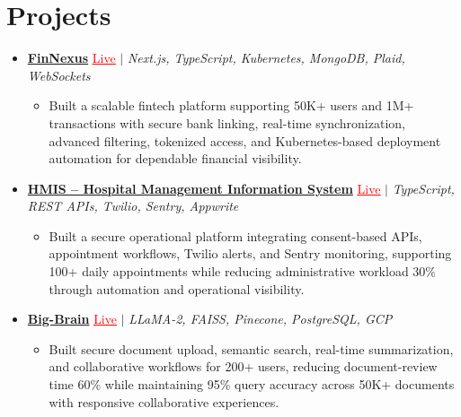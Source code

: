 \documentclass[letterpaper,10pt]{article}
\newcommand{\itemTail}{\vspace{-5pt}}
\newcommand{\projGap}{\vspace{3pt}}
\newcommand{\resumeItem}[1]{\item\small{{#1 \itemTail}}}
\newcommand{\resumeProjectHeading}[1]{\item \small #1 \vspace{-2pt}}
\newcommand{\resumeProjectLink}[2]{\href{#1}{\textcolor{red}{\underline{#2}}}}
\newcommand{\resumeSubHeadingListStart}{\begin{itemize}[leftmargin=0.0in, label={}]}
\newcommand{\resumeSubHeadingListEnd}{\end{itemize}}
\newcommand{\resumeProjItemListStart}{\begin{itemize}[leftmargin=0.15in,label=\textbullet,itemsep=3pt,topsep=0pt,parsep=0pt,partopsep=0pt]}
\newcommand{\resumeProjItemListEnd}{\end{itemize}\vspace{-4pt}}
\begin{document}
\section{Projects}
\resumeSubHeadingListStart
\vspace{-2pt}
\resumeProjectHeading{\href{https://fin-nexus.vercel.app/}{\textbf{FinNexus}} \resumeProjectLink{https://fin-nexus.vercel.app/}{Live} $|$ \emph{Next.js, TypeScript, Kubernetes, MongoDB, Plaid, WebSockets}}
\resumeProjItemListStart
\resumeItem{Built a scalable fintech platform supporting 50K+ users and 1M+ transactions with secure bank linking, real-time synchronization, advanced filtering, tokenized access, and Kubernetes-based deployment automation for dependable financial visibility.}
\resumeProjItemListEnd
\projGap
\resumeProjectHeading{\href{https://hims-rouge.vercel.app/}{\textbf{HMIS -- Hospital Management Information System}} \resumeProjectLink{https://hims-rouge.vercel.app/}{Live} $|$ \emph{TypeScript, REST APIs, Twilio, Sentry, Appwrite}}
\resumeProjItemListStart
\resumeItem{Built a secure operational platform integrating consent-based APIs, appointment workflows, Twilio alerts, and Sentry monitoring, supporting 100+ daily appointments while reducing administrative workload 30\% through automation and operational visibility.}
\resumeProjItemListEnd
\projGap
\resumeProjectHeading{\href{https://big-brain-pied.vercel.app/}{\textbf{Big-Brain}} \resumeProjectLink{https://big-brain-pied.vercel.app/}{Live} $|$ \emph{LLaMA-2, FAISS, Pinecone, PostgreSQL, GCP}}
\resumeProjItemListStart
\resumeItem{Built secure document upload, semantic search, real-time summarization, and collaborative workflows for 200+ users, reducing document-review time 60\% while maintaining 95\% query accuracy across 50K+ documents with responsive collaborative experiences.}
\resumeProjItemListEnd
\resumeSubHeadingListEnd
\end{document}
